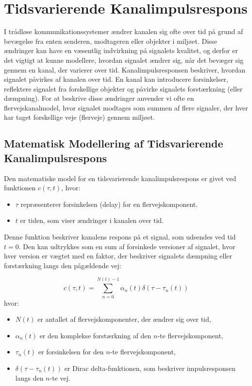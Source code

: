 \documentclass[a4paper,12pt]{book}
\begin{document}
		
	\section{Tidsvarierende Kanalimpulsrespons}
	I trådløse kommunikationssystemer ændrer kanalen sig ofte over tid på grund af bevægelse fra enten senderen, modtageren eller objekter i miljøet. Disse ændringer kan have en væsentlig indvirkning på signalets kvalitet, og derfor er det vigtigt at kunne modellere, hvordan signalet ændrer sig, når det bevæger sig gennem en kanal, der varierer over tid.
	\newline\newline
	Kanalimpulsresponsen beskriver, hvordan signalet påvirkes af kanalen over tid. En kanal kan introducere forsinkelser, reflektere signalet fra forskellige objekter og påvirke signalets forstærkning (eller dæmpning). For at beskrive disse ændringer anvender vi ofte en flervejskanalmodel, hvor signalet modtages som summen af flere signaler, der hver har taget forskellige veje (flerveje) gennem miljøet.
	
	\subsection{Matematisk Modellering af Tidsvarierende Kanalimpulsrespons}
	Den matematiske model for en tidsvarierende kanalimpulsrespons er givet ved funktionen \(c(\tau, t)\), hvor:
	\begin{itemize}
		\item \( \tau \) repræsenterer forsinkelsen (delay) for en flervejskomponent.
		\item \( t \) er tiden, som viser ændringer i kanalen over tid.
	\end{itemize}
	
	Denne funktion beskriver kanalens respons på et signal, som udsendes ved tid \( t = 0 \). Den kan udtrykkes som en sum af forsinkede versioner af signalet, hvor hver version er vægtet med en faktor, der beskriver signalets dæmpning eller forstærkning langs den pågældende vej:
	
	\[
	c(\tau, t) = \sum_{n=0}^{N(t)-1} \alpha_n(t) \delta(\tau - \tau_n(t))
	\]
	hvor:
	\begin{itemize}
		\item \( N(t) \) er antallet af flervejskomponenter, der ændrer sig over tid,
		\item \( \alpha_n(t) \) er den komplekse forstærkning af den \( n \)-te flervejskomponent,
		\item \( \tau_n(t) \) er forsinkelsen for den \( n \)-te flervejskomponent,
		\item \( \delta(\tau - \tau_n(t)) \) er Dirac delta-funktionen, som beskriver impulsresponsen langs den \( n \)-te vej.
	\end{itemize}
	
\end{document}
